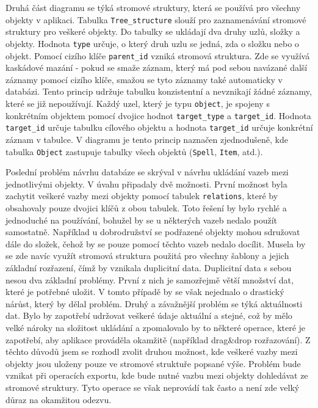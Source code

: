 \documentclass[thesis=B,czech]{resources/FITthesis}[2012/06/26]
\begin{document}
Druhá část diagramu se týká stromové struktury, která se používá pro všechny objekty v aplikaci. Tabulka \texttt{Tree\_structure} slouží pro zaznamenávání stromové struktury pro veškeré objekty. Do tabulky se ukládají dva druhy uzlů, složky a objekty. Hodnota \texttt{type} určuje, o který druh uzlu se jedná, zda o složku nebo o objekt. Pomocí cizího klíče \texttt{parent\_id} vzniká stromová struktura. Zde se využívá kaskádové mazání - pokud se smaže záznam, který má pod sebou navázané další záznamy pomocí cizího klíče, smažou se tyto záznamy také automaticky v databázi. Tento princip udržuje tabulku konzistentní a nevznikají žádné záznamy, které se již nepoužívají. Každý uzel, který je typu \texttt{object}, je spojeny s konkrétním objektem pomocí dvojice hodnot \texttt{target\_type} a \texttt{target\_id}. Hodnota \texttt{target\_id} určuje tabulku cílového objektu a hodnota \texttt{target\_id} určuje konkrétní záznam v tabulce. V diagramu je tento princip naznačen zjednodušeně, kde tabulka \texttt{Object} zastupuje tabulky všech objektů (\texttt{Spell}, \texttt{Item}, atd.). \par

Poslední problém návrhu databáze se skrýval v návrhu ukládání vazeb mezi jednotlivými objekty. V úvahu připadaly dvě možnosti. První možnost byla zachytit veškeré vazby mezi objekty pomocí tabulek \texttt{relations}, které by obsahovaly pouze dvojici klíčů z obou tabulek. Toto řešení by bylo rychlé a jednoduché na používání, bohužel by se u některých vazeb nedalo použít samostatně. Například u dobrodružství se podřazené objekty mohou sdružovat dále do složek, čehož by se pouze pomocí těchto vazeb nedalo docílit. Musela by se zde navíc využít stromová struktura použitá pro všechny šablony a jejich základní rozřazení, čímž by vznikala duplicitní data. Duplicitní data s sebou nesou dva základní problémy. První z nich je samozřejmě větší množství dat, které je potřebné uložit. V tomto případě by se však nejednalo o drastický nárůst, který by dělal problém. Druhý a závažnější problém se týká aktuálnosti dat. Bylo by zapotřebí udržovat veškeré údaje aktuální a stejné, což by mělo velké nároky na složitost ukládání a zpomalovalo by to některé operace, které je zapotřebí, aby aplikace prováděla okamžitě (například drag\&drop rozřazování). Z těchto důvodů jsem se rozhodl zvolit druhou možnost, kde veškeré vazby mezi objekty jsou uloženy pouze ve stromové struktuře popsané výše. Problém bude vznikat při operacích exportu, kde bude nutné vazbu mezi objekty dohledávat ze stromové struktury. Tyto operace se však neprovádí tak často a není zde velký důraz na okamžitou odezvu. 
\end{document}

